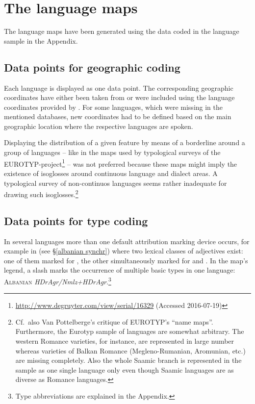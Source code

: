 \section{The language maps}
The language maps have been generated using the data coded in the language sample in the Appendix.

\subsection[Geographic coding]{Data points for geographic coding}
Each language is displayed as one data point. The corresponding geographic coordinates have either been taken from \cite{walsOnline2013} or were included using the language coordinates provided by \cite{AUTOTYP}. For some languages, which were missing in the mentioned databases, new coordinates had to be defined based on the main geographic location where the respective languages are spoken.

Displaying the distribution of a given feature by means of a borderline around a group of languages – like in the maps used by typological surveys of the EUROTYP\hyp{}project\footnote{\url{http://www.degruyter.com/view/serial/16329} (Accessed 2016-07-19)} – was not preferred because these maps might imply the existence of isoglosses around continuous language and dialect areas. A typological survey of non-continuos languages seems rather inadequate for drawing such isoglosses.\footnote{Cf.~also Van Pottelberge's \citeyear{van-pottelberge2001} critique of EUROTYP's “name maps”. Furthermore, the Eurotyp sample of languages are somewhat arbitrary. The western Romance varieties, for instance, are represented in large number whereas varieties of Balkan Romance (Megleno-Rumanian, Aromunian, etc.) are missing completely. Also the whole Saamic branch is represented in the  sample as one single language only even though Saamic languages are as diverse as Romance languages.}

\subsection[Type coding]{Data points for type coding}
In several languages more than one default attribution marking device occurs, for example in  (see \S\ref{albanian synchr}) where two lexical classes of adjectives exist: one of them marked for , the other simultaneously marked for  and . In the map's legend, a slash marks the occurrence of multiple basic types in one language: \textsc{Albanian} \textit{HDrAgr/Nmlz+HDrAgr}.\footnote{Type abbreviations are explained in the Appendix.}


